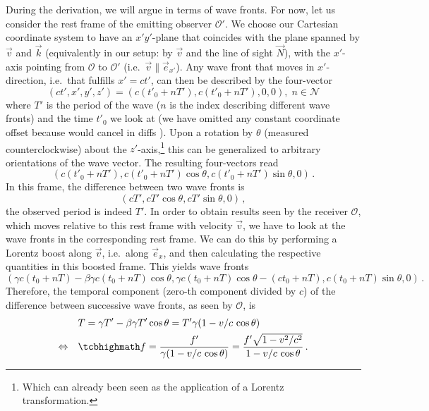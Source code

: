 \documentclass[../relativity_main.tex]{subfiles}
\begin{document}
During the derivation, we will argue in terms of wave fronts. For now, let us consider the rest frame of the emitting observer $\mathcal{O}'$. We choose our Cartesian coordinate system to have an $x' y'$-plane that coincides with the plane spanned by $\vec{v}$ and $\vec{k}$ (equivalently in our setup: by $\vec{v}$ and the line of sight $\vec{N}$), with the $x'$-axis pointing from $\mathcal{O}$ to $\mathcal{O}'$ (i.e.~$\vec{v} \parallel \vec{e}_{x'}$). Any wave front that moves in $x'$-direction, i.e.~that fulfills $x' = c t'$, can then be described by the four-vector
\begin{equation}
	(c t', x', y', z') = (c (t'_0 + n T'), c (t'_0 + n T'), 0, 0), \; n \in \mathcal{N}
\end{equation}
where $T'$ is the period of the wave ($n$ is the index describing different wave fronts) and the time $t'_0$ we look at (we have omitted any constant coordinate offset because would cancel in diffs ). Upon a rotation by $\theta$ (measured counterclockwise) about the $z'$-axis,\footnote{Which can already been seen as the application of a Lorentz transformation.} this can be generalized to arbitrary orientations of the wave vector. The resulting four-vectors read
\begin{equation}
	(c (t'_0 + n T'), c (t'_0 + n T') \cos \theta, c (t'_0 + n T') \sin \theta, 0) \, .
\end{equation}
In this frame, the difference between two wave fronts is
\begin{equation}
	(c T', c T' \cos \theta, c T' \sin \theta, 0) \, ,
\end{equation}
the observed period is indeed $T'$. In order to obtain results seen by the receiver $\mathcal{O}$, which moves relative to this rest frame with velocity $\vec{v}$, we have to look at the wave fronts in the corresponding rest frame. We can do this by performing a Lorentz boost along $\vec{v}$, i.e.~along $\vec{e}_x$, and then calculating the respective quantities in this boosted frame. This yields wave fronts
\begin{equation}
	(\gamma c (t_0 + n T) - \beta \gamma c (t_0 + n T) \cos \theta, \gamma c (t_0 + n T) \cos \theta - (c t_0 + n T), c (t_0 + n T) \sin \theta, 0) \, .
\end{equation}
Therefore, the temporal component (zero-th component divided by $c$) of the difference between successive wave fronts, as seen by $\mathcal{O}$, is
\begin{align}
	& T = \gamma T' - \beta \gamma T' \cos \theta = T' \gamma (1 - v / c \, \cos \theta)
	\notag\\
	\Leftrightarrow \quad & \eqbox{f = \frac{f'}{\gamma (1 - v / c \, \cos \theta)} = \frac{f' \sqrt{1 - v^2 / c^2}}{1 - v / c \, \cos \theta}}
	\label{eq:general_doppler_v2}
	\, .
\end{align}
\end{document}
